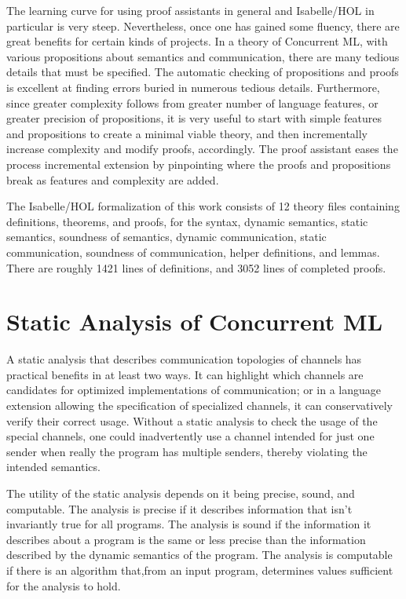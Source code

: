 \documentclass[letterpaper, 11pt]{report}
\begin{document}
The learning curve for using proof assistants in general and Isabelle/HOL in particular is very steep.
Nevertheless, once one has gained some fluency, there are great benefits for certain kinds of projects.
In a theory of Concurrent ML, with various propositions about semantics and communication, there are many
tedious details that must be specified. 
The automatic checking of propositions and proofs is excellent at finding errors buried in numerous tedious details.
Furthermore, since greater complexity follows from greater
number of language features, or greater precision of propositions, it is very useful to start with simple features
and propositions to create a minimal viable theory, and then incrementally increase complexity and modify proofs, accordingly.
The proof assistant eases the process incremental extension by pinpointing where the proofs and propositions break
as features and complexity are added.

The Isabelle/HOL formalization of this work consists of 12 theory files containing definitions, theorems,
and proofs, for the syntax, dynamic semantics, static semantics, soundness of semantics, dynamic communication,
static communication, soundness of communication, helper definitions, and lemmas. 
There are roughly 1421 lines of definitions, and 3052 lines of completed proofs. 

\section{Static Analysis of Concurrent ML}
A static analysis that describes communication
topologies of channels has practical benefits in at least two ways. It can highlight which
channels are candidates for optimized implementations of communication; or in a language
extension allowing the specification of specialized channels, it can conservatively verify
their correct usage. Without a static analysis to check the usage of the special channels, one
could inadvertently use a channel intended for just one sender when really the program has multiple senders, 
thereby violating the intended semantics. 

The utility of the static analysis depends on it being precise, sound, and computable. 
The analysis is precise if it describes information that isn't invariantly true for all programs. 
The analysis is sound if the information it describes about a program is the same or less precise than the information 
described by the dynamic semantics of the program. The analysis is computable if there is an algorithm that,from an input program, determines values sufficient for the analysis to hold.
\end{document}
